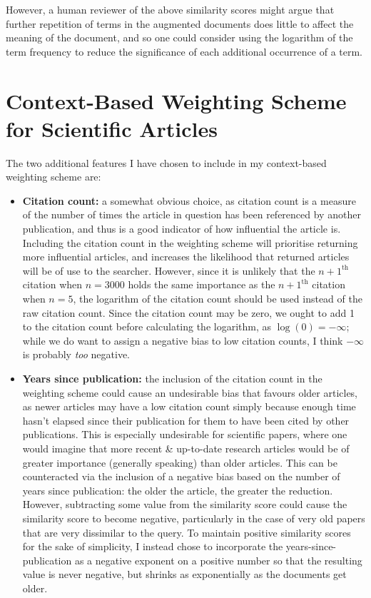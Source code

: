 \documentclass[a4paper]{article}
\begin{document}
However, a human reviewer of the above similarity scores might argue that further repetition of terms in the augmented documents does little to affect the meaning of the document, and so one could consider using the logarithm of the term frequency to reduce the significance of each additional occurrence of a term.

\section{Context-Based Weighting Scheme for Scientific Articles}
The two additional features I  have chosen to include in my context-based weighting scheme are:
\begin{itemize}
    \item   \textbf{Citation count:} a somewhat obvious choice, as citation count is a measure of the number of times the article in question has been referenced by another publication, and thus is a good indicator of how influential the article is.
            Including the citation count in the weighting scheme will prioritise returning more influential articles, and increases the likelihood that returned articles will be of use to the searcher.
            However, since it is unlikely that the $n+1^\text{th}$ citation when $n = 3000$ holds the same importance as the $n+1^\text{th}$ citation when $n = 5$, the logarithm of the citation count should be used instead of the raw citation count.
            Since the citation count may be zero, we ought to add 1 to the citation count before calculating the logarithm, as $\log(0) = - \infty$; while we do want to assign a negative bias to low citation counts, I think $-\infty$ is probably \textit{too} negative.

    \item   \textbf{Years since publication:} the inclusion of the citation count in the weighting scheme could cause an undesirable bias that favours older articles, as newer articles may have a low citation count simply because enough time hasn't elapsed since their publication for them to have been cited by other publications.
            This is especially undesirable for scientific papers, where one would imagine that more recent \& up-to-date research articles would be of greater importance (generally speaking) than older articles.
            This can be counteracted via the inclusion of a negative bias based on the number of years since publication: the older the article, the greater the reduction.
            However, subtracting some value from the similarity score could cause the similarity score to become negative, particularly in the case of very old papers that are very dissimilar to the query.
            To maintain positive similarity scores for the sake of simplicity, I instead chose to incorporate the years-since-publication as a negative exponent on a positive number so that the resulting value is never negative, but shrinks as exponentially as the documents get older.
\end{itemize}
\end{document}
